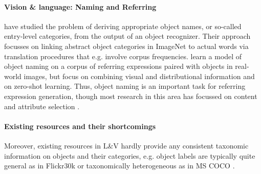 \paragraph{Vision \& language: Naming and Referring}

 have studied the problem of deriving appropriate object names, or so-called entry-level
 categories, from the output of an object recognizer. Their approach focusses on linking abstract object categories in ImageNet to actual words via translation procedures that e.g. involve corpus frequencies. 
  learn a model of object naming on a corpus of referring expressions paired with objects in real-world images, but focus on combining visual and distributional information and on zero-shot learning.
 Thus, object naming is an important task for referring expression generation, though most research in this area has focussed on content and attribute selection \cite{Kazemzadeh2014,gkatzia:2015,zarrieschlang:easy-pre,Maoetal:cocorefexp}.

\paragraph{Existing resources and their shortcomings}
Moreover, existing resources in L\&V hardly provide any consistent taxonomic information on objects and their categories, e.g. object labels are typically quite general as in Flickr30k \cite[e.g.,~]{plummer2015flickr30kentities} or taxonomically heterogeneous as in MS COCO \cite[e.g.,~]{mscoco}.


